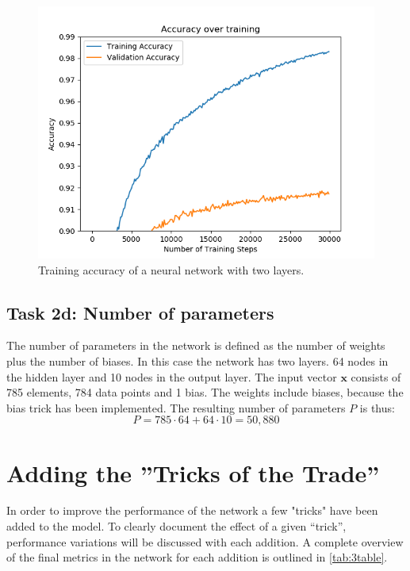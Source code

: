 \documentclass{article}
\begin{document}
\begin{figure}[H]
    \centering
    \includegraphics[width=\textwidth]{Assignments/Assignment_2/plots/task2abc/2c_accuracy.png}
    \caption{Training accuracy of a neural network with two layers.}
    \label{fig:task2acc}
\end{figure}


\subsection{Task 2d: Number of parameters}
The number of parameters in the network is defined as the number of weights plus the number of biases. In this case the network has two layers. 64 nodes in the hidden layer and 10 nodes in the output layer. The input vector $\boldsymbol{x}$ consists of 785 elements, 784 data points and 1 bias. The weights include biases, because the bias trick has been implemented. The resulting number of parameters $P$ is thus:
\begin{equation}
    P = 785\cdot64 + 64\cdot 10 = 50,880 
    \label{eq:num_params}
\end{equation}


\section{Adding the ”Tricks of the Trade”}

In order to improve the performance of the network a few "tricks" have been added to the model. To clearly document the effect of a given ``trick'', performance variations will be discussed with each addition. A complete overview of the final metrics in the network for each addition is outlined in \autoref{tab:3table}.
\end{document}
